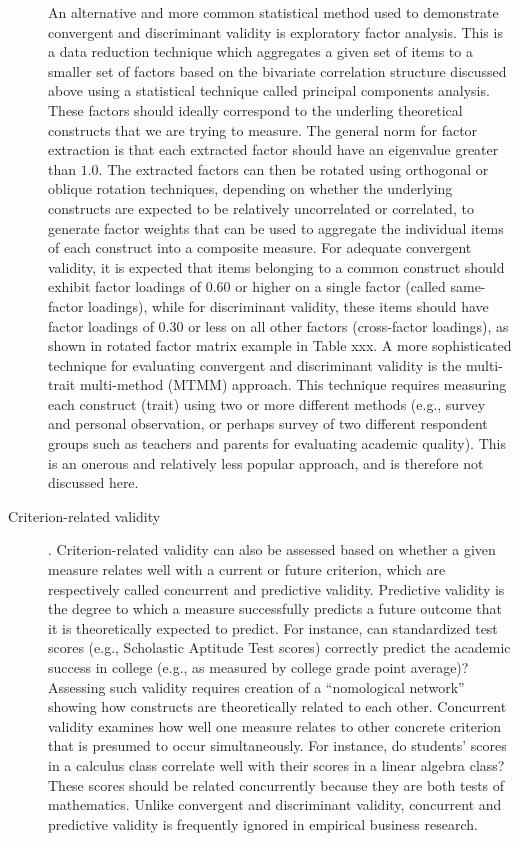 \begin{description}
	An alternative and more common statistical method used to demonstrate convergent and discriminant validity is exploratory factor analysis. This is a data reduction technique which aggregates a given set of items to a smaller set of factors based on the bivariate correlation structure discussed above using a statistical technique called principal components analysis. These factors should ideally correspond to the underling theoretical constructs that we are trying to measure. The general norm for factor extraction is that each extracted factor should have an eigenvalue greater than $ 1.0 $. The extracted factors can then be rotated using orthogonal or oblique rotation techniques, depending on whether the underlying constructs are expected to be relatively uncorrelated or correlated, to generate factor weights that can be used to aggregate the individual items of each construct into a composite measure. For adequate convergent validity, it is expected that items belonging to a common construct should exhibit factor loadings of $ 0.60 $ or higher on a single factor (called same-factor loadings), while for discriminant validity, these items should have factor loadings of $ 0.30 $ or less on all other factors (cross-factor loadings), as shown in rotated factor matrix example in Table xxx. A more sophisticated technique for evaluating convergent and discriminant validity is the multi-trait multi-method (\textsc{MTMM}) approach. This technique requires measuring each construct (trait) using two or more different methods (e.g., survey and personal observation, or perhaps survey of two different respondent groups such as teachers and parents for evaluating academic quality). This is an onerous and relatively less popular approach, and is therefore not discussed here.

	\item[Criterion-related validity]. Criterion-related validity can also be assessed based on whether a given measure relates well with a current or future criterion, which are respectively called concurrent and predictive validity. Predictive validity is the degree to which a measure successfully predicts a future outcome that it is theoretically expected to predict. For instance, can standardized test scores (e.g., Scholastic Aptitude Test scores) correctly predict the academic success in college (e.g., as measured by college grade point average)? Assessing such validity requires creation of a ``nomological network'' showing how constructs are theoretically related to each other. Concurrent validity examines how well one measure relates to other concrete criterion that is presumed to occur simultaneously. For instance, do students' scores in a calculus class correlate well with their scores in a linear algebra class? These scores should be related concurrently because they are both tests of mathematics. Unlike convergent and discriminant validity, concurrent and predictive validity is frequently ignored in empirical business research.

\end{description}

